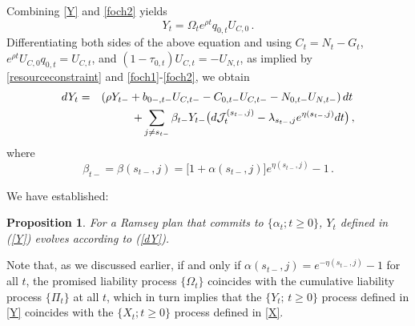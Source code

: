 \documentclass[12pt]{article}
\newtheorem{proposition}{Proposition}
\begin{document}
Combining \eqref{Y} and \eqref{foch2} yields
\begin{equation}
Y_t =\Omega_t e^{\rho t}q_{0, t}U_{C, 0}\,. %
\end{equation}
Differentiating both sides of the above equation and using $C_t = N_t - G_t$, $e^{\rho t} U_{C, 0} q_{0, t}=U_{C, t}$, and $(1-\tau_{0, t}) U_{C, t}  = -  U_{N, t}$, as implied by \eqref{resourceconstraint} and \eqref{foch1}-\eqref{foch2}, we obtain
\begin{eqnarray}\label{dY} 
dY_t  %
& = & \left(\rho Y_{t-}+b_{0-, t-}U_{C, t-}-C_{0, t-}U_{C, t-} -N_{0, t-}U_{N, t-}  \right)dt\,  \notag \\
& & \quad + \sum_{j\neq s_{t-}} \beta_{t-}Y_{t-} 
\big(d {\mathcal J}_t^{(s_{t-}, j)} 
- \lambda_{s_{t-}, j} e^{\eta(s_{t-}, j)} dt \big) \,,
\end{eqnarray}
where 
\begin{equation} \label{beta}
\beta_{t-}=\beta(s_{t-}, j) = \big[1+\alpha(s_{t-}, j)\big]e^{\eta(s_{t-}, j)}-1\,. 
\end{equation}


  


We have established: 
\begin{proposition} 
	For a Ramsey plan that commits to $\{\alpha_t; t\geq 0 \}$, 
	$Y_t$ defined in (\ref{Y})  evolves according to  (\ref{dY}).
\end{proposition}

Note that, as we discussed earlier, if and only if $\alpha(s_{t-}, j)= e^{-\eta(s_{t-}, j)}-1 $ for all $t$, the promised liability process $\{\Omega_t\}$ coincides with the cumulative liability process $\{\Pi_t\}$ at all $t$, which in turn implies that the $\{Y_t;\, t\geq 0\}$ process defined in \eqref{Y} coincides with the $\{X_t; t\geq 0\}$ process defined in \eqref{X}. 
\end{document}
